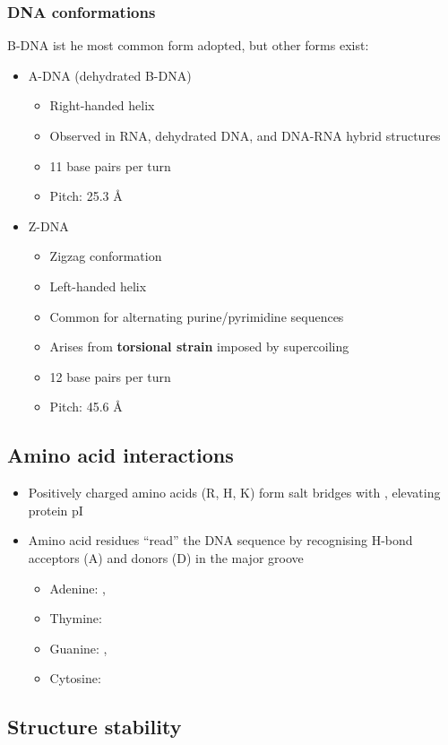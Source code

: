 \documentclass[letterpaper, 12pt]{article}
\begin{document}
\subsubsection*{DNA conformations}
B-DNA ist he most common form adopted, but other forms exist:
\begin{itemize}
\item A-DNA (dehydrated B-DNA)
\begin{itemize}
\item Right-handed helix
\item Observed in RNA, dehydrated DNA, and DNA-RNA hybrid structures
\item 11 base pairs per turn
\item Pitch: 25.3 Å
\end{itemize}
\item Z-DNA
\begin{itemize}
\item Zigzag conformation
\item Left-handed helix
\item Common for alternating purine/pyrimidine sequences
\item Arises from \textbf{torsional strain} imposed by supercoiling
\item 12 base pairs per turn
\item Pitch: 45.6 Å
\end{itemize}
\end{itemize}

\subsection*{Amino acid interactions}
\begin{itemize}
\item Positively charged amino acids (R, H, K) form salt bridges with , elevating protein pI
\item Amino acid residues ``read'' the DNA sequence by recognising H-bond acceptors (A) and donors (D) in the major groove
\begin{itemize}
\item Adenine: , 
\item Thymine: 
\item Guanine: , 
\item Cytosine: 
\end{itemize}
\end{itemize}

\subsection*{Structure stability}
\end{document}
